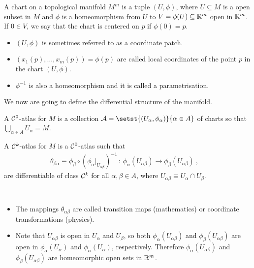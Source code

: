 \begin{definition}
	A chart on a topological manifold $M^m$ is a tuple $(U,\phi)$, where $U\subseteq M$ is a open subset in $M$ and $\phi$ is a homeomorphism from $U$ to $V=\phi(U)\subseteq \mathbb R^m$ open in $\mathbb R^m$. If $0\in V$, we say that the chart is centered on $p$ if $\phi(0)=p$.

	\begin{itemize}
		\item $(U,\phi)$ is sometimes referred to as a coordinate patch.
		\item $(x_1(p),\dots,x_m(p))=\phi(p)$ are called local coordinates of the point $p$ in the chart $(U, \phi)$.
		\item $\phi^{-1}$ is also a homeomorphism and it is called a parametrisation.
	\end{itemize}

\end{definition}

We now are going to define the differential structure of the manifold.

\begin{definition}
	A $\mathcal{C}^0$-atlas for $M$ is a collection $\calA = \setst{(U_\alpha, \phi_\alpha)}{\alpha\in A}$ of charts so that $\bigcup_{\alpha\in A} U_\alpha = M$.
\end{definition}

\begin{definition}
	A $\mathcal{C}^k$-atlas for $M$ is a $\mathcal{C}^0$-atlas such that
	\begin{align*}
		\theta_{\beta\alpha} \equiv {\phi_\beta \circ ({\phi_\alpha}\rvert_{U_{\alpha\beta}})^{-1}} \,:\, \phi_\alpha(U_{\alpha\beta}) \to \phi_\beta(U_{\alpha\beta}) ~,\quad
	\end{align*}
	are differentiable of class $\mathcal{C}^k$ for all $\alpha,\beta \in A$, where $U_{\alpha\beta} \equiv U_\alpha \cap U_\beta$.
\end{definition}

\begin{remark}
	~
	\begin{itemize}
		\item The mappings $\theta_{\alpha\beta}$ are called transition maps (mathematics) or coordinate transformations (physics).
		\item Note that $U_{\alpha\beta}$ is open in $U_\alpha$ and $U_\beta$, so both $\phi_\alpha(U_{\alpha\beta})$ and $\phi_\beta(U_{\alpha\beta})$ are open in $\phi_\alpha(U_{\alpha})$ and $\phi_\alpha(U_{\alpha})$, respectively. Therefore $\phi_\alpha(U_{\alpha\beta})$ and $\phi_\beta(U_{\alpha\beta})$ are homeomorphic open sets in $\mathbb R^m$.
	\end{itemize} 
\end{remark}

